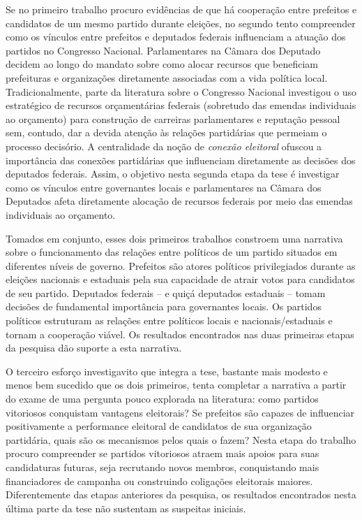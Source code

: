 Se no primeiro trabalho procuro evidências de que há cooperação entre prefeitos e candidatos de um mesmo partido durante eleições, no segundo tento compreender como os vínculos entre prefeitos e deputados federais influenciam a atuação dos partidos no Congresso Nacional. Parlamentares na Câmara dos Deputado decidem ao longo do mandato sobre como alocar recursos que beneficiam prefeituras e organizações diretamente associadas com a vida política local. Tradicionalmente, parte da literatura sobre o Congresso Nacional investigou o uso estratégico de recursos orçamentárias federais (sobretudo das emendas individuais ao orçamento) para construção de carreiras parlamentares e reputação pessoal sem, contudo, dar a devida atenção às relações partidárias que permeiam o processo decisório. A centralidade da noção de \emph{conexão eleitoral} ofuscou a importância das conexões partidárias que influenciam diretamente as decisões dos deputados federais. Assim, o objetivo nesta segunda etapa da tese é investigar como os vínculos entre governantes locais e parlamentares na Câmara dos Deputados afeta diretamente alocação de recursos federais por meio das emendas individuais ao orçamento.

Tomados em conjunto, esses dois primeiros trabalhos constroem uma narrativa sobre o funcionamento das relações entre políticos de um partido situados em diferentes níveis de governo. Prefeitos são atores políticos privilegiados durante as eleições nacionais e estaduais pela sua capacidade de atrair votos para candidatos de seu partido. Deputados federais -- e quiçá deputados estaduais -- tomam decisões de fundamental importância para governantes locais. Os partidos políticos estruturam as relações entre políticos locais e nacionais/estaduais e tornam a cooperação viável. Os resultados encontrados nas duas primeiras etapas da pesquisa dão suporte a esta narrativa.

O terceiro esforço investigavito que integra a tese, bastante mais modesto e menos bem sucedido que os dois primeiros, tenta completar a narrativa a partir do exame de uma pergunta pouco explorada na literatura: como partidos vitoriosos conquistam vantagens eleitorais? Se prefeitos são capazes de influenciar positivamente a performance eleitoral de candidatos de sua organização partidária, quais são os mecanismos pelos quais o fazem? Nesta etapa do trabalho procuro compreender se partidos vitoriosos atraem mais apoios para suas candidaturas futuras, seja recrutando novos membros, conquistando mais financiadores de campanha ou construindo coligações eleitorais maiores. Diferentemente das etapas anteriores da pesquisa, os resultados encontrados nesta última parte da tese não sustentam as suspeitas iniciais.

